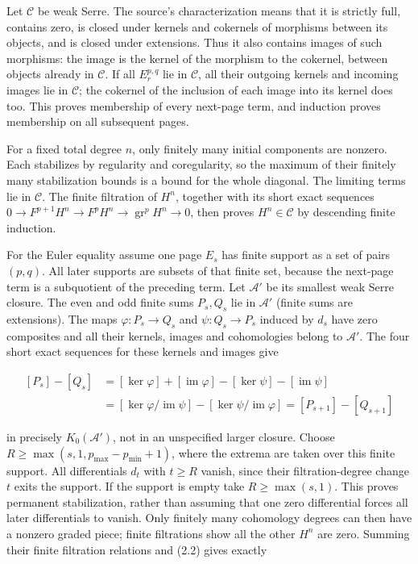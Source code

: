 \documentclass[11pt]{article}
\begin{document}
Let \(\mathcal C\) be weak Serre. The source's characterization means that it is strictly full, contains zero, is closed under kernels and cokernels of morphisms between its objects, and is closed under extensions. Thus it also contains images of such morphisms: the image is the kernel of the morphism to the cokernel, between objects already in \(\mathcal C\). If all \(E_r^{p,q}\) lie in \(\mathcal C\), all their outgoing kernels and incoming images lie in \(\mathcal C\); the cokernel of the inclusion of each image into its kernel does too. This proves membership of every next-page term, and induction proves membership on all subsequent pages.

For a fixed total degree \(n\), only finitely many initial components are nonzero. Each stabilizes by regularity and coregularity, so the maximum of their finitely many stabilization bounds is a bound for the whole diagonal. The limiting terms lie in \(\mathcal C\). The finite filtration of \(H^n\), together with its short exact sequences \(0\to F^{p+1}H^n\to F^pH^n\to\operatorname{gr}^pH^n\to0\), then proves \(H^n\in\mathcal C\) by descending finite induction.

For the Euler equality assume one page \(E_s\) has finite support as a set of pairs \((p,q)\). All later supports are subsets of that finite set, because the next-page term is a subquotient of the preceding term. Let \(\mathcal A'\) be its smallest weak Serre closure. The even and odd finite sums \(P_s,Q_s\) lie in \(\mathcal A'\) (finite sums are extensions). The maps \(\varphi:P_s\to Q_s\) and \(\psi:Q_s\to P_s\) induced by \(d_s\) have zero composites and all their kernels, images and cohomologies belong to \(\mathcal A'\). The four short exact sequences for these kernels and images give

\[
\begin{aligned}
[P_s]-[Q_s]
&=[\ker\varphi]+[\operatorname{im}\varphi]
 -[\ker\psi]-[\operatorname{im}\psi]\\
&=[\ker\varphi/\operatorname{im}\psi]
 -[\ker\psi/\operatorname{im}\varphi]
=[P_{s+1}]-[Q_{s+1}]
\end{aligned}                                             \tag{2.2}
\]

in precisely \(K_0(\mathcal A')\), not in an unspecified larger closure. Choose \(R\geq\max(s,1,p_{\max}-p_{\min}+1)\), where the extrema are taken over this finite support. All differentials \(d_t\) with \(t\geq R\) vanish, since their filtration-degree change \(t\) exits the support. If the support is empty take \(R\geq\max(s,1)\). This proves permanent stabilization, rather than assuming that one zero differential forces all later differentials to vanish. Only finitely many cohomology degrees can then have a nonzero graded piece; finite filtrations show all the other \(H^n\) are zero. Summing their finite filtration relations and (2.2) gives exactly
\end{document}

